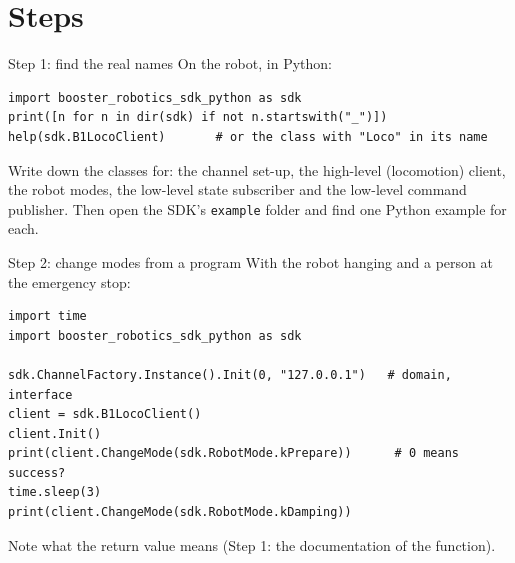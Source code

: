 \begin{center}
\end{center}

\section*{Steps}
\begin{stepbox}{Step 1: find the real names}
On the robot, in Python:
\begin{verbatim}
import booster_robotics_sdk_python as sdk
print([n for n in dir(sdk) if not n.startswith("_")])
help(sdk.B1LocoClient)       # or the class with "Loco" in its name
\end{verbatim}
Write down the classes for: the channel set-up, the high-level (locomotion) client, the robot modes, the low-level state subscriber and the low-level command publisher. Then open the SDK's \texttt{example} folder and find one Python example for each.
\end{stepbox}

\begin{stepbox}{Step 2: change modes from a program}
With the robot hanging and a person at the emergency stop:
\begin{verbatim}
import time
import booster_robotics_sdk_python as sdk

sdk.ChannelFactory.Instance().Init(0, "127.0.0.1")   # domain, interface
client = sdk.B1LocoClient()
client.Init()
print(client.ChangeMode(sdk.RobotMode.kPrepare))      # 0 means success?
time.sleep(3)
print(client.ChangeMode(sdk.RobotMode.kDamping))
\end{verbatim}
Note what the return value means (Step 1: the documentation of the function).
\end{stepbox}

